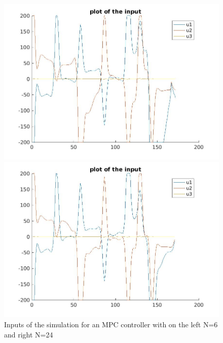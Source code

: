\documentclass[•]{article}
\begin{document}
\begin{figure}[H]
\begin{minipage}{.45\textwidth}
\includegraphics[width = \textwidth]{mpcinput6.jpg}
\end{minipage}
\begin{minipage}{.45\textwidth}
\includegraphics[width = \textwidth]{mpcinput24.jpg}
\end{minipage}
\caption{Inputs of the simulation for an MPC controller with on the left N=6 and right N=24}
\end{figure}
\end{document}
